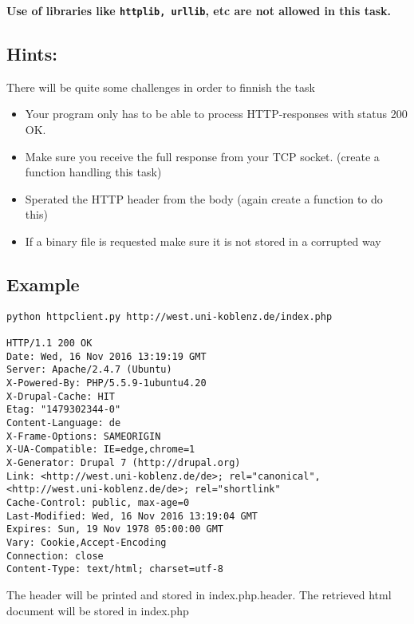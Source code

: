 \documentclass{WeSTassignment}
\begin{document}
\textbf{Use of libraries like \texttt{httplib, urllib}, etc are not allowed in this task.}

\subsection{Hints:}
There will be quite some challenges in order to finnish the task
\begin{itemize}
\item Your program only has to be able to process HTTP-responses with status 200 OK.
\item Make sure you receive the full response from your TCP socket. (create a function handling this task)
\item Sperated the HTTP header from the body (again create a function to do this)
\item If a binary file is requested make sure it is not stored in a corrupted way
\end{itemize}


\subsection{Example}
\begin{lstlisting}
python httpclient.py http://west.uni-koblenz.de/index.php

HTTP/1.1 200 OK
Date: Wed, 16 Nov 2016 13:19:19 GMT
Server: Apache/2.4.7 (Ubuntu)
X-Powered-By: PHP/5.5.9-1ubuntu4.20
X-Drupal-Cache: HIT
Etag: "1479302344-0"
Content-Language: de
X-Frame-Options: SAMEORIGIN
X-UA-Compatible: IE=edge,chrome=1
X-Generator: Drupal 7 (http://drupal.org)
Link: <http://west.uni-koblenz.de/de>; rel="canonical",<http://west.uni-koblenz.de/de>; rel="shortlink"
Cache-Control: public, max-age=0
Last-Modified: Wed, 16 Nov 2016 13:19:04 GMT
Expires: Sun, 19 Nov 1978 05:00:00 GMT
Vary: Cookie,Accept-Encoding
Connection: close
Content-Type: text/html; charset=utf-8

\end{lstlisting}
The header will be printed and stored in index.php.header. The retrieved html document will be stored in index.php \\
\end{document}
